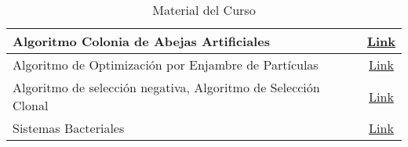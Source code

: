 \begin{table}[h]
\begin{tabular}{l|c}
\\ \hline
Algoritmo Colonia de Abejas Artificiales &
\href{https://drive.google.com/open?id=1-NhXrdXVhMANFshgm24QMYGRh9g5BfKv}{Link}
\\ \hline
Algoritmo de Optimización por Enjambre de Partículas &
\href{https://drive.google.com/open?id=1HxAtmyuYZgkv2UQePSbijxF813Xwfy7p}{Link}
\\ \hline
Algoritmo de selección negativa, Algoritmo de Selección Clonal &
\href{https://drive.google.com/open?id=1K2exv47Ixy9Pe3_Hr5zbyui5TJlxirgq}{Link}
\\ \hline
Sistemas Bacteriales &
\href{https://drive.google.com/open?id=14b8w1vd9g9obFXUA5A6lyFPeydRavTal}{Link}
\\ \hline
\end{tabular}
\caption{Material del Curso}
\label{tab:material_curso} %
\end{table}

